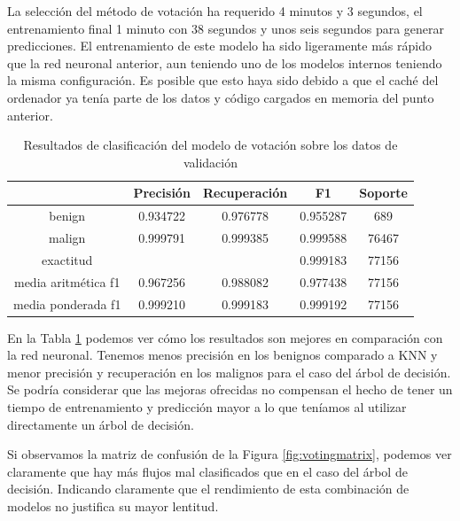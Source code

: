 La selección del método de votación ha requerido 4 minutos y 3 segundos, el entrenamiento final 1 minuto con 38 segundos y unos seis segundos para generar predicciones. El entrenamiento de este modelo ha sido ligeramente más rápido que la red neuronal anterior, aun teniendo uno de los modelos internos teniendo la misma configuración. Es posible que esto haya sido debido a que el caché del ordenador ya tenía parte de los datos y código cargados en memoria del punto anterior.

\begin{table}[H]
    \begin{center}
        \begin{tabular}{|c | c c c | c |} 
            \hline
            & \textbf{Precisión} & \textbf{Recuperación} & \textbf{F1}  & \textbf{Soporte} \\
            \hline
            benign               & 0.934722 & 0.976778 & 0.955287  &   689 \\
            malign               & 0.999791 & 0.999385 & 0.999588  & 76467 \\
            \hline
            exactitud            &          &          & 0.999183 & 77156 \\
            media aritmética f1  & 0.967256 & 0.988082 & 0.977438 & 77156 \\
            media ponderada f1   & 0.999210 & 0.999183 & 0.999192 & 77156 \\
            \hline
        \end{tabular}
    \end{center}
    \caption{Resultados de clasificación del modelo de votación sobre los datos de validación}
    \label{table:votingresults}
\end{table}

En la Tabla \ref{table:votingresults} podemos ver cómo los resultados son mejores en comparación con la red neuronal. Tenemos menos precisión en los benignos comparado a KNN y menor precisión y recuperación en los malignos para el caso del árbol de decisión. Se podría considerar que las mejoras ofrecidas no compensan el hecho de tener un tiempo de entrenamiento y predicción mayor a lo que teníamos al utilizar directamente un árbol de decisión.

Si observamos la matriz de confusión de la Figura \ref{fig:votingmatrix}, podemos ver claramente que hay más flujos mal clasificados que en el caso del árbol de decisión. Indicando claramente que el rendimiento de esta combinación de modelos no justifica su mayor lentitud.

